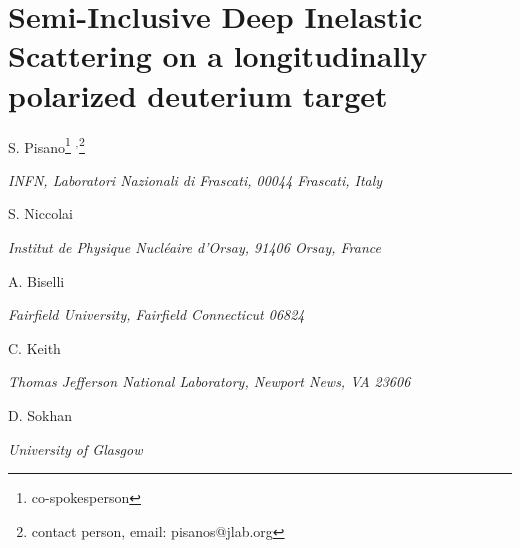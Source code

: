 \documentclass[12pt]{report}
\begin{document}
\newpage
\chapter{Semi-Inclusive Deep Inelastic Scattering on a longitudinally polarized deuterium target}

\centerline{S. Pisano\footnote{co-spokesperson} $^,$\footnote{contact person, email: pisanos@jlab.org}}
\centerline{\it INFN, Laboratori Nazionali di Frascati, 00044 Frascati, Italy}
\vskip 0.4cm
\centerline{S. Niccolai\footnotemark[1]}
\centerline{\it Institut de Physique Nucl\'eaire d'Orsay, 91406 Orsay, France}
\vskip 0.4cm
\centerline{A. Biselli\footnotemark[1]}
\centerline{\it Fairfield University, Fairfield Connecticut 06824}
\vskip 0.4cm
\centerline{C. Keith\footnotemark[1]}
\centerline{\it Thomas Jefferson National Laboratory, Newport News, VA 23606}
\vskip 0.4cm
\centerline{D. Sokhan\footnotemark[1]}
\centerline{\it University of Glasgow}
\vskip 0.4cm
\end{document}
